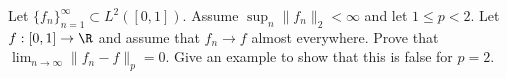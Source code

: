 Let $\{f_n\}_{n=1}^{\infty}\subset L^2([0,1])$. Assume
$\sup_n\|f_n\|_2<\infty$ and let $1\leq p<2$. Let $f:[0,1]\rightarrow
\R$ and assume that $f_n\rightarrow f$ almost everywhere. Prove that
$\lim_{n\rightarrow \infty}\|f_n-f\|_p=0$. Give an example to show
that this is false for $p=2$.

